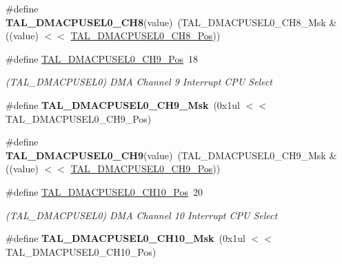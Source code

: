 \begin{DoxyCompactItemize}
\item 
\hypertarget{group___s_a_m_l21___t_a_l_ga047f7f8aac0780bae276fdde288eb1a8}{}\#define {\bfseries T\+A\+L\+\_\+\+D\+M\+A\+C\+P\+U\+S\+E\+L0\+\_\+\+C\+H8}(value)~(T\+A\+L\+\_\+\+D\+M\+A\+C\+P\+U\+S\+E\+L0\+\_\+\+C\+H8\+\_\+\+Msk \& ((value) $<$$<$ \hyperlink{group___s_a_m_l21___t_a_l_ga0370e61be98e11df89372599deb71bdd}{T\+A\+L\+\_\+\+D\+M\+A\+C\+P\+U\+S\+E\+L0\+\_\+\+C\+H8\+\_\+\+Pos}))\label{group___s_a_m_l21___t_a_l_ga047f7f8aac0780bae276fdde288eb1a8}

\item 
\hypertarget{group___s_a_m_l21___t_a_l_ga64589eff1f500ba5cbcb784e0545990e}{}\#define \hyperlink{group___s_a_m_l21___t_a_l_ga64589eff1f500ba5cbcb784e0545990e}{T\+A\+L\+\_\+\+D\+M\+A\+C\+P\+U\+S\+E\+L0\+\_\+\+C\+H9\+\_\+\+Pos}~18\label{group___s_a_m_l21___t_a_l_ga64589eff1f500ba5cbcb784e0545990e}

\begin{DoxyCompactList}\small\item\em (T\+A\+L\+\_\+\+D\+M\+A\+C\+P\+U\+S\+E\+L0) D\+M\+A Channel 9 Interrupt C\+P\+U Select \end{DoxyCompactList}\item 
\hypertarget{group___s_a_m_l21___t_a_l_gaebe4956c9f048c836fb7af79dc567fb1}{}\#define {\bfseries T\+A\+L\+\_\+\+D\+M\+A\+C\+P\+U\+S\+E\+L0\+\_\+\+C\+H9\+\_\+\+Msk}~(0x1ul $<$$<$ T\+A\+L\+\_\+\+D\+M\+A\+C\+P\+U\+S\+E\+L0\+\_\+\+C\+H9\+\_\+\+Pos)\label{group___s_a_m_l21___t_a_l_gaebe4956c9f048c836fb7af79dc567fb1}

\item 
\hypertarget{group___s_a_m_l21___t_a_l_gaa2cf354c3489713cfdbbc69b0cc666bb}{}\#define {\bfseries T\+A\+L\+\_\+\+D\+M\+A\+C\+P\+U\+S\+E\+L0\+\_\+\+C\+H9}(value)~(T\+A\+L\+\_\+\+D\+M\+A\+C\+P\+U\+S\+E\+L0\+\_\+\+C\+H9\+\_\+\+Msk \& ((value) $<$$<$ \hyperlink{group___s_a_m_l21___t_a_l_ga64589eff1f500ba5cbcb784e0545990e}{T\+A\+L\+\_\+\+D\+M\+A\+C\+P\+U\+S\+E\+L0\+\_\+\+C\+H9\+\_\+\+Pos}))\label{group___s_a_m_l21___t_a_l_gaa2cf354c3489713cfdbbc69b0cc666bb}

\item 
\hypertarget{group___s_a_m_l21___t_a_l_ga2cbca6bb6bad8ed95d6ebe9f4b2c4428}{}\#define \hyperlink{group___s_a_m_l21___t_a_l_ga2cbca6bb6bad8ed95d6ebe9f4b2c4428}{T\+A\+L\+\_\+\+D\+M\+A\+C\+P\+U\+S\+E\+L0\+\_\+\+C\+H10\+\_\+\+Pos}~20\label{group___s_a_m_l21___t_a_l_ga2cbca6bb6bad8ed95d6ebe9f4b2c4428}

\begin{DoxyCompactList}\small\item\em (T\+A\+L\+\_\+\+D\+M\+A\+C\+P\+U\+S\+E\+L0) D\+M\+A Channel 10 Interrupt C\+P\+U Select \end{DoxyCompactList}\item 
\hypertarget{group___s_a_m_l21___t_a_l_ga97f64b96580b6e9392db655034d7f42e}{}\#define {\bfseries T\+A\+L\+\_\+\+D\+M\+A\+C\+P\+U\+S\+E\+L0\+\_\+\+C\+H10\+\_\+\+Msk}~(0x1ul $<$$<$ T\+A\+L\+\_\+\+D\+M\+A\+C\+P\+U\+S\+E\+L0\+\_\+\+C\+H10\+\_\+\+Pos)\label{group___s_a_m_l21___t_a_l_ga97f64b96580b6e9392db655034d7f42e}


\end{DoxyCompactItemize}
